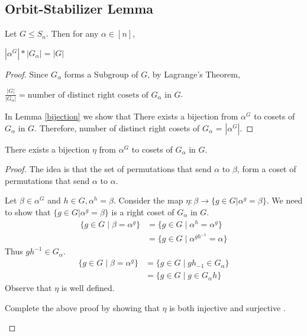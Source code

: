 \subsection{Orbit-Stabilizer Lemma}
\begin{theorem}
Let $G\leq S_n$. Then for any $\alpha \in [n]$,
\begin{center}
$|\alpha^G|*|G_{\alpha}| = |G|$ 
\end{center}
\end{theorem}
\begin{proof}
Since $G_{\alpha}$ forms a Subgroup of $G$, by Lagrange's Theorem,
\begin{center}
$\frac{|G|}{|G_{\alpha}|} = \mbox{number of distinct right cosets of $G_\alpha$ in $G$}$. 
\end{center}
In Lemma \ref{bijection} we show that There exists a bijection from $\alpha^G$ to cosets of $G_{\alpha}$ in $G$. Therefore, number of distinct right cosets of $G_{\alpha}$ = $|\alpha^G|$. 
\end{proof}


\begin{lemma}
\label{bijection}
There exists a bijection $\eta$ from $\alpha^G$ to cosets of $G_{\alpha}$ in $G$.
\end{lemma}
\begin{proof}
The idea is that the set of permutations that send $\alpha$ to $\beta$, form a coset of permutations that send $\alpha$ to $\alpha$.

Let $\beta \in \alpha^G$ and $h \in G,\alpha^h = \beta$. Consider the map
$\eta : \beta \rightarrow \{g \in G| \alpha^g = \beta \} $. We need to show that  $\{g \in G| \alpha^g = \beta \} $ is a right coset of $G_\alpha$ in $G$.
\begin{align*}
\{g \in G\mid \beta = \alpha^g\} &= \{ g \in G \mid \alpha^h = \alpha^g \}\\
 &=  \{ g \in G \mid \alpha^{gh^{-1}} = \alpha\}
\end{align*}
Thus $gh^{-1} \in G_{\alpha}$.
\begin{align*}
\{g \in G\mid \beta = \alpha^g\}  &= \{ g \in G \mid gh_{-1} \in G_{\alpha} \}\\
 &=  \{ g \in G \mid g \in G_{\alpha}h \}
\end{align*}
Observe that $\eta$ is well defined.

\begin{exercise}
Complete the above proof by showing that $\eta$ is both injective and surjective .
\end{exercise}
\end{proof}




